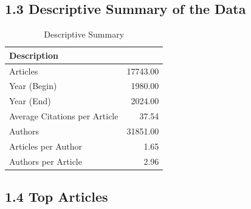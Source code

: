 \documentclass[
  12pt,
]{article}
\begin{document}
\subsection{1.3 Descriptive Summary of the
Data}\label{descriptive-summary-of-the-data}

\begin{table}[H]

\caption{\label{tab:descriptives}Descriptive Summary}
\centering
\begin{tabular}[t]{lr}
\toprule
Description & \\
\midrule
Articles & 17743.00\\
Year (Begin) & 1980.00\\
Year (End) & 2024.00\\
Average Citations per Article & 37.54\\
Authors & 31851.00\\
Articles per Author & 1.65\\
Authors per Article & 2.96\\
\bottomrule
\end{tabular}
\end{table}

\newpage

\subsection{1.4 Top Articles}\label{top-articles}

\begingroup\fontsize{8}{10}\selectfont
\end{document}
